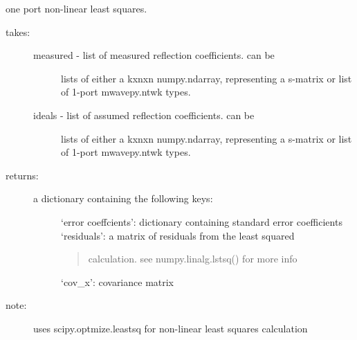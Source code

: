 \documentclass[letterpaper,10pt,english]{sphinxmanual}
\begin{document}
\begin{fulllineitems}
\label{api/mwavepy.calibration:mwavepy.calibration.calibrationAlgorithms.one_port_nls}
one port non-linear least squares.
\begin{description}
\item[{takes: }] \leavevmode\begin{description}
\item[{measured - list of measured reflection coefficients. can be }] \leavevmode
lists of either a kxnxn numpy.ndarray, representing a 
s-matrix or list of  1-port mwavepy.ntwk types.

\item[{ideals - list of assumed reflection coefficients. can be }] \leavevmode
lists of either a kxnxn numpy.ndarray, representing a 
s-matrix or list of  1-port mwavepy.ntwk types.

\end{description}

\item[{returns:}] \leavevmode\begin{description}
\item[{a dictionary containing the following keys:}] \leavevmode
`error coeffcients': dictionary containing standard error
coefficients
`residuals': a matrix of residuals from the least squared
\begin{quote}

calculation. see numpy.linalg.lstsq() for more info
\end{quote}

`cov\_x': covariance matrix

\end{description}

\item[{note:}] \leavevmode
uses scipy.optmize.leastsq for non-linear least squares calculation

\end{description}

\end{fulllineitems}

\end{document}
